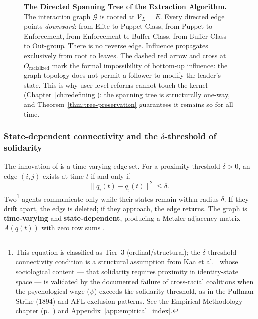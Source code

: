\begin{figure}[htbp]
\caption{\textbf{The Directed Spanning Tree of the Extraction Algorithm.} The interaction graph $\mathcal{G}$ is rooted at $\mathcal{V}_L = E$. Every directed edge points \textit{downward}: from Elite to Puppet Class, from Puppet to Enforcement, from Enforcement to Buffer Class, from Buffer Class to Out-group. There is no reverse edge. Influence propagates exclusively from root to leaves. The dashed red arrow and cross at $O_{\text{racialized}}$ mark the formal impossibility of bottom-up influence: the graph topology does not permit a follower to modify the leader's state. This is why user-level reforms cannot touch the kernel (Chapter~\ref{ch:redefining}): the spanning tree is structurally one-way, and Theorem~\ref{thm:tree-preservation} guarantees it remains so for all time.}
\label{fig:spanning_tree}
\end{figure}

\subsubsection*{State-dependent connectivity and the \texorpdfstring{$\delta$}{delta}-threshold of solidarity}

The innovation of \cite{kan_containment} is a time-varying edge set. For a proximity threshold $\delta > 0$, an edge $(i,j)$ exists at time $t$ if and only if
\begin{equation}
\|q_i(t) - q_j(t)\|^2 \leq \delta. \label{eq:8.6-proximity-connectivity-condition}
\end{equation}
Two\footnote{This equation is classified as Tier~3 (ordinal/structural); the $\delta$-threshold connectivity condition is a structural assumption from Kan et al.\ \cite{kan_containment} whose sociological content --- that solidarity requires proximity in identity-state space --- is validated by the documented failure of cross-racial coalitions when the psychological wage ($\psi$) exceeds the solidarity threshold, as in the Pullman Strike (1894) and AFL exclusion patterns. See the Empirical Methodology chapter (p.~\pageref{ch:empirical_methodology}) and Appendix~\ref{app:empirical_index}.} agents communicate only while their states remain within radius $\delta$. If they drift apart, the edge is deleted; if they approach, the edge returns. The graph is \textbf{time-varying} and \textbf{state-dependent}, producing a Metzler adjacency matrix $A(q(t))$ with zero row sums \cite{moreau_consensus}.

